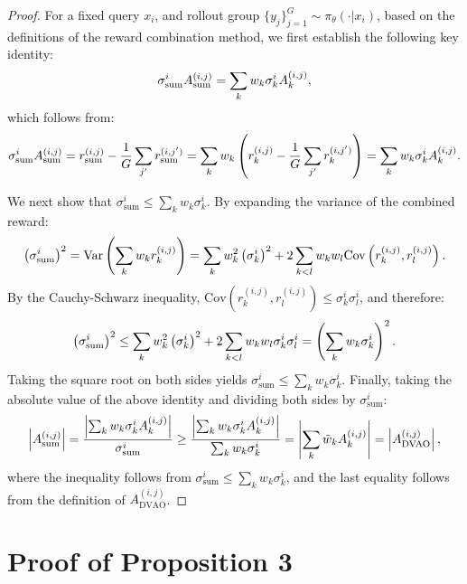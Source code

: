 \documentclass{llmxive}
\providecommand{\Var}{\mathrm{Var}}
\providecommand{\Cov}{\mathrm{Cov}}
\begin{document}
\begin{proof}
    For a fixed query $x_i$, and rollout group $\{y_j\}_{j=1}^G \sim \pi_\theta (\cdot | x_i)$, based on the definitions of the reward combination method, we first establish the following key identity:
    \begin{align}
        \sigma_\text{sum}^i A_\text{sum}^{(i,j)} = \sum_k w_k \sigma_k^i A_k^{(i,j)},\notag
    \end{align}
    which follows from:
    \begin{align}
        \sigma_\text{sum}^i A_\text{sum}^{(i,j)} = r_\text{sum}^{(i,j)} - \frac{1}{G} \sum_{j'}r_\text{sum}^{(i,j')} = \sum_k w_k \left( r_k^{(i,j)} - \frac{1}{G}\sum_{j'}r_k^{(i,j')} \right) = \sum_k w_k \sigma_k^i A_k^{(i,j)}.\notag
    \end{align}
    
    We next show that $\sigma_\text{sum}^i \le \sum_k w_k \sigma_k^i$. By expanding the variance of the combined reward:
    \begin{align}
        \left(\sigma_\text{sum}^i\right)^2 = \Var\left( \sum_k w_k r_k^{(i,j)} \right) = \sum_k w_k^2 \left(\sigma_k^i\right)^2 + 2 \sum_{k < l} w_k w_l \Cov\left(r_k^{(i,j)}, r_l^{(i,j)}\right).\notag
    \end{align}
    By the Cauchy-Schwarz inequality, $\Cov\left(r_k^{(i,j)}, r_l^{(i,j)}\right) \le \sigma_k^i \sigma_l^i$, and therefore:
    \begin{align}
        \left(\sigma_\text{sum}^i\right)^2 \le \sum_k w_k^2 \left(\sigma_k^i\right)^2 + 2\sum_{k < l} w_k w_l \sigma_k^i \sigma_l^i = \left(\sum_k w_k \sigma_k^i\right)^2.\notag
    \end{align}
    Taking the square root on both sides yields $\sigma_\text{sum}^i \le \sum_k w_k \sigma_k^i$. Finally, taking the absolute value of the above identity and dividing both sides by $\sigma_\text{sum}^i$:
    \begin{align}
        \left|A_\text{sum}^{(i,j)}\right| = \frac{\left|\sum_k w_k \sigma_k^i A_k^{(i,j)}\right|}{\sigma_\text{sum}^i} \ge \frac{\left|\sum_k w_k \sigma_k^i A_k^{(i,j)}\right|}{\sum_kw_k \sigma_k^i} = \left|\sum_k \tilde{w}_k A_k^{(i,j)}\right| = \left|A_\text{DVAO}^{(i,j)}\right|,\notag
    \end{align}
    where the inequality follows from $\sigma_\text{sum}^i \le \sum_k w_k \sigma_k^i$, and the last equality follows from the definition of $A_\text{DVAO}^{(i,j)}$.
\end{proof}

\section{Proof of Proposition 3}
\label{appendix:proof_of_proposition_3}
\end{document}

